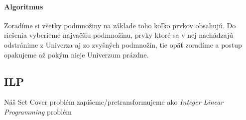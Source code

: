 \paragraph{Algoritmus} Zoradíme si všetky podmnožiny na základe toho koľko prvkov obsahujú.
Do riešenia vyberieme najvačšiu podmnožinu, prvky ktoré sa v nej nachádzajú odstránime z Univerza aj zo zvyšných podmnožín, tie opäť zoradíme a postup opakujeme až pokým nieje Univerzum prázdne.
\subsection{ILP}
Náš Set Cover problém zapíšeme/pretransformujeme ako \emph{Integer Linear Programming} problém
